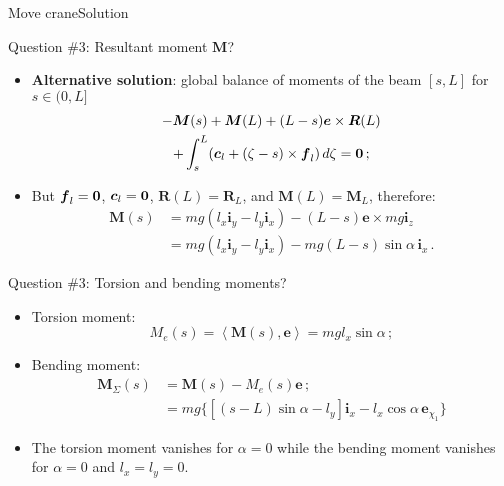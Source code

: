 \documentclass{beamer}
\newcommand{\id}{d}
\newcommand{\cj}{c}
\newcommand{\cv}{{\boldsymbol\cj}}
\newcommand{\xj}{x}
\newcommand{\yj}{y}
\newcommand{\zj}{z}
\newcommand{\ej}{e}
\renewcommand{\ij}{i}
\newcommand{\ev}{{\boldsymbol\ej}}
\newcommand{\iv}{{\boldsymbol\ij}}
\newcommand*{\xiu}{\chi_1}
\newcommand{\fj}{f}
\newcommand{\fv}{{\boldsymbol\fj}}
\newcommand{\Fresj}{R}
\newcommand{\Mresj}{M}
\newcommand{\Fres}{{\boldsymbol\Fresj}}
\newcommand{\Mres}{{\boldsymbol\Mresj}}
\newcommand{\bzero}{{\bf 0}}
\newcommand{\scal}[1]{\left\langle{#1}\right\rangle}
\begin{document}
\begin{frame}{Move crane}{Solution}
\begin{overprint}
\vskip-20pt
\begin{exampleblock}{Question \#3: Resultant moment $\Mres$?}
\begin{itemize}
\item {\bf Alternative solution}: global balance of moments of the beam $[s,L]$ for $s\in(0,L]$
\begin{multline*}
-\Mres(s)+\Mres(L)+(L-s)\ev\times\Fres(L) \\
+\int_s^L(\cv_l+(\zeta-s)\times\fv_l)\,\id\zeta=\bzero\,;
\end{multline*}
\item But $\fv_l=\bzero$, $\cv_l=\bzero$, $\Fres(L)=\Fres_L$, and $\Mres(L)=\Mres_L$, therefore:
\begin{displaymath}
\begin{split}
\Mres(s) &=mg(l_\xj\iv_\yj-l_\yj\iv_\xj)-(L-s)\ev\times mg\iv_\zj \\
&=mg(l_\xj\iv_\yj-l_\yj\iv_\xj)-mg(L-s)\sin\alpha\,\iv_\xj\,.
\end{split}
\end{displaymath}
\end{itemize}
\end{exampleblock}

\vskip-20pt
\begin{exampleblock}{Question \#3: Torsion and bending moments?}
\begin{itemize}
\item Torsion moment:
\begin{displaymath}
\Mresj_e(s)=\scal{\Mres(s),\ev}=mgl_\xj \sin\alpha\,;
\end{displaymath}
\item Bending moment:
\begin{displaymath}
\begin{split}
\Mres_\Sigma(s) &=\Mres(s)-\Mresj_e(s)\ev\,; \\
&=mg\{[(s-L)\sin\alpha-l_\yj]\iv_\xj-l_\xj\cos\alpha\,\ev_{\xiu}\}
\end{split}
\end{displaymath}
\item The torsion moment vanishes for $\alpha=0$ while the bending moment vanishes for $\alpha=0$ and $l_\xj=l_\yj=0$.
\end{itemize}
\end{exampleblock}

\end{overprint}

\end{frame}
\end{document}
